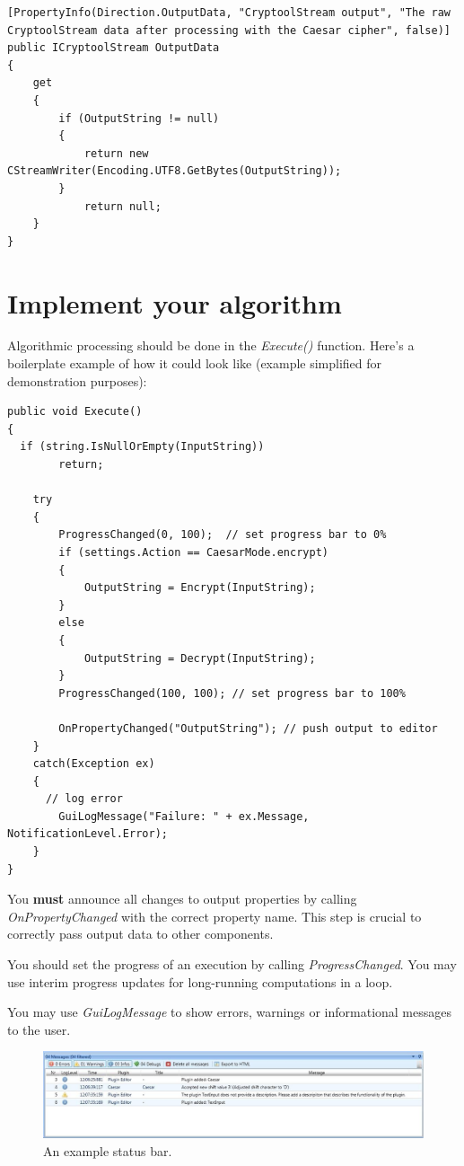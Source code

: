 \begin{lstlisting}
[PropertyInfo(Direction.OutputData, "CryptoolStream output", "The raw CryptoolStream data after processing with the Caesar cipher", false)]
public ICryptoolStream OutputData
{
	get
	{
		if (OutputString != null)
		{                    
			return new CStreamWriter(Encoding.UTF8.GetBytes(OutputString));
		}
			return null;
	}
}
\end{lstlisting}

\section{Implement your algorithm}
\label{sec:ImplementingTheActualAlgorithm}

Algorithmic processing should be done in the \textit{Execute()} function. Here's a boilerplate example of how it could look like (example simplified for demonstration purposes):

\begin{lstlisting}
public void Execute()
{
  if (string.IsNullOrEmpty(InputString))
		return;
	
	try
	{
		ProgressChanged(0, 100);  // set progress bar to 0%
		if (settings.Action == CaesarMode.encrypt)
		{
			OutputString = Encrypt(InputString);
		}
		else
		{
			OutputString = Decrypt(InputString);
		}
		ProgressChanged(100, 100); // set progress bar to 100%
		
		OnPropertyChanged("OutputString"); // push output to editor
	}
	catch(Exception ex)
	{
	  // log error
		GuiLogMessage("Failure: " + ex.Message, NotificationLevel.Error);
	}
}
\end{lstlisting}

You \textbf{must} announce all changes to output properties by calling \textit{OnPropertyChanged} with the correct property name. This step is crucial to correctly pass output data to other components.

You should set the progress of an execution by calling \textit{ProgressChanged}. You may use interim progress updates for long-running computations in a loop.

You may use \textit{GuiLogMessage} to show errors, warnings or informational messages to the user.

\begin{figure}[h]
	\centering
		\includegraphics[width=1.00\textwidth]{figures/status_bar.jpg}
	\caption{An example status bar.}
	\label{fig:status_bar}
\end{figure}

